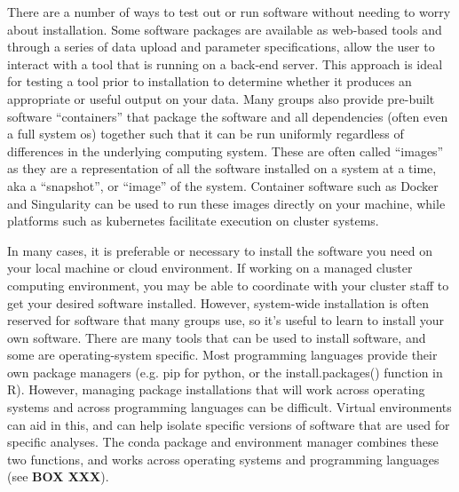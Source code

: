 \documentclass[10pt,letterpaper]{article}
\begin{document}
There are a number of ways to test out or run software without needing to worry about installation. 
Some software packages are available as web-based tools and through a series of data upload and parameter specifications, allow the user to interact with a tool that is running on a back-end server. 
This approach is ideal for testing a tool prior to installation to determine whether it produces an appropriate or useful output on your data. 
Many groups also provide pre-built software “containers” that package the software and all dependencies (often even a full system os) together such that it can be run uniformly regardless of differences in the underlying computing system. 
These are often called “images” as they are a representation of all the software installed on a system at a time, aka a “snapshot”, or “image” of the system. 
Container software such as Docker and Singularity can be used to run these images directly on your machine, while platforms such as kubernetes facilitate execution on cluster systems.

In many cases, it is preferable or necessary to install the software you need on your local machine or cloud environment. 
If working on a managed cluster computing environment, you may be able to coordinate with your cluster staff to get your desired software installed. 
However, system-wide installation is often reserved for software that many groups use, so it’s useful to learn to install your own software. 
There are many tools that can be used to install software, and some are operating-system specific. 
Most programming languages provide their own package managers (e.g. pip for python, or the install.packages() function in R). 
However, managing package installations that will work across operating systems and across programming languages can be difficult. 
Virtual environments can aid in this, and can help isolate specific versions of software that are used for specific analyses. 
The conda package and environment manager combines these two functions, and works across operating systems and programming languages (see \textbf{BOX XXX}). 
\end{document}
